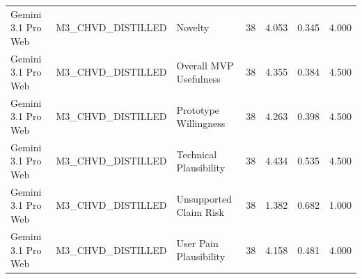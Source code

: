 \documentclass[10pt]{article}
\begin{document}
\begin{landscape}
\begin{longtable}{lllrrrr}
Gemini 3.1 Pro Web & M3\_CHVD\_DISTILLED & Novelty & 38 & 4.053 & 0.345 & 4.000 \\
Gemini 3.1 Pro Web & M3\_CHVD\_DISTILLED & Overall MVP Usefulness & 38 & 4.355 & 0.384 & 4.500 \\
Gemini 3.1 Pro Web & M3\_CHVD\_DISTILLED & Prototype Willingness & 38 & 4.263 & 0.398 & 4.500 \\
Gemini 3.1 Pro Web & M3\_CHVD\_DISTILLED & Technical Plausibility & 38 & 4.434 & 0.535 & 4.500 \\
Gemini 3.1 Pro Web & M3\_CHVD\_DISTILLED & Unsupported Claim Risk & 38 & 1.382 & 0.682 & 1.000 \\
Gemini 3.1 Pro Web & M3\_CHVD\_DISTILLED & User Pain Plausibility & 38 & 4.158 & 0.481 & 4.000 \\
\end{longtable}
\end{landscape}
\end{document}
